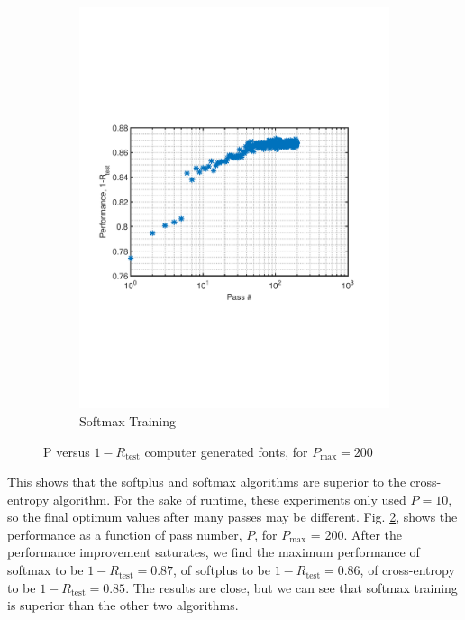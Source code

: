 \documentclass[journal,a4paper,onecolumn,11pt]{IEEEtran}
\begin{document}
\begin{figure}[!h]
\begin{subfigure}{.5\textwidth}
			\includegraphics[clip, trim=0cm .25cm 0cm .5cm, width=1.1\textwidth]{performance_fnt_sm_200run.pdf}
		\caption{Softmax Training}
		\label{fig:performance_fnt_sm_200run}
	\end{subfigure}%
	\caption{P versus $1-R_{\text{test}}$ computer generated fonts, for $P_{\text{max}}=200$}
	\label{fig:sm_ce}
\end{figure}
This shows that the softplus and softmax algorithms are superior to the cross-entropy algorithm. For the sake of runtime, these experiments only used $P=10$, so the final optimum values after many passes may be different. Fig. \ref{fig:sm_ce}, shows the performance as a function of pass number, $P$, for $P_{\text{max}}$ = 200. After the performance improvement saturates, we find the maximum performance of softmax to be $1-R_\text{test}=0.87$, of softplus to be $1-R_\text{test}=0.86$, of cross-entropy to be $1-R_\text{test}=0.85$. The results are close, but we can see that softmax training is superior than the other two algorithms.
\end{document}
